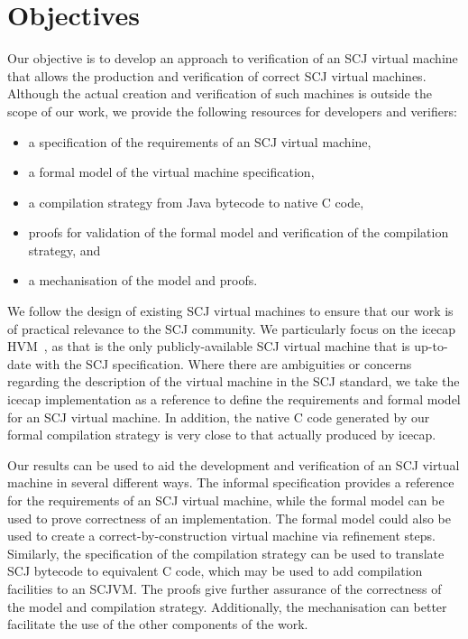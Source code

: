 \section{Objectives}

Our objective is to develop an approach to verification of an SCJ
virtual machine that allows the production and verification of correct
SCJ virtual machines.
Although the actual creation and verification of such machines is
outside the scope of our work, we provide the following resources for
developers and verifiers:
\begin{itemize}
\item a specification of the requirements of an SCJ virtual machine,
\item a formal model of the virtual machine specification,
\item a compilation strategy from Java bytecode to native C code,
\item proofs for validation of the formal model and verification of
  the compilation strategy, and
\item a mechanisation of the model and proofs.
\end{itemize}

We follow the design of existing SCJ virtual machines to ensure that
our work is of practical relevance to the SCJ community.
We particularly focus on the icecap HVM~\cite{sondergaard2012}, as
that is the only publicly-available SCJ virtual machine that is
up-to-date with the SCJ specification.
Where there are ambiguities or concerns regarding the description of
the virtual machine in the SCJ standard, we take the icecap
implementation as a reference to define the requirements and formal
model for an SCJ virtual machine.
In addition, the native C code generated by our formal compilation
strategy is very close
to that actually produced by icecap.

Our results can be used to aid the development and verification of an
SCJ virtual machine in several different ways.
The informal specification provides a reference for the requirements
of an SCJ virtual machine, while the formal model can be used to prove
correctness of an implementation.
The formal model could also be used to create a
correct-by-construction virtual machine via refinement steps.
Similarly, the specification of the compilation strategy can be used
to translate SCJ bytecode to equivalent C code, which may be used to
add compilation facilities to an SCJVM.
The proofs give further assurance of the correctness of the model and
compilation strategy.
Additionally, the mechanisation can better facilitate the use of the
other components of the work.


